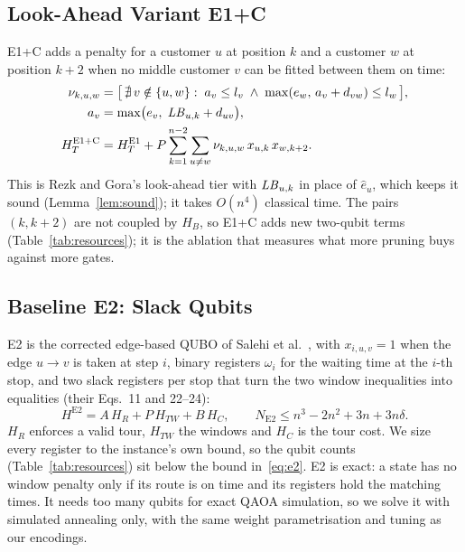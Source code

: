 \subsection{Look-Ahead Variant E1+C}\label{sec:e1c}
E1+C adds a penalty for a customer $u$ at position $k$ and a customer $w$ at position $k+2$ when
no middle customer $v$ can be fitted between them on time:
\begin{align}
  \nu_{k,u,w} &= \bigl[\,\nexists\, v \notin \{u,w\}:\; a_v \le l_v \;\land\; \max(e_w,\, a_v + d_{vw}) \le l_w\,\bigr], \label{eq:la}\\
  a_v &= \max\bigl(e_v,\; \mathit{LB}_{u,k} + d_{uv}\bigr), \nonumber\\
  H_T^{\mathrm{E1+C}} &= H_T^{\mathrm{E1}} + P\sum_{k=1}^{n-2}\sum_{u\neq w}\nu_{k,u,w}\,x_{u,k}\,x_{w,k+2}. \label{eq:HT1C}
\end{align}
This is Rezk and Gora's look-ahead tier with $\mathit{LB}_{u,k}$ in place of $\hat e_u$, which keeps it
sound (Lemma~\ref{lem:sound}); it takes $O(n^4)$ classical time. The pairs $(k,k+2)$ are not
coupled by $H_B$, so E1+C adds new two-qubit terms (Table~\ref{tab:resources}); it is the
ablation that measures what more pruning buys against more gates.

\subsection{Baseline E2: Slack Qubits}\label{sec:e2}
E2 is the corrected edge-based QUBO of Salehi et al.~\cite{salehi2022unconstrained}, with
$x_{i,u,v}=1$ when the edge $u\to v$ is taken at step $i$, binary registers $\omega_i$ for the
waiting time at the $i$-th stop, and two slack registers per stop that turn the two window
inequalities into equalities (their Eqs.~11 and 22--24):
\begin{equation}
  H^{\mathrm{E2}} = A\,H_R + P\,H_{TW} + B\,H_C, \qquad
  N_{\mathrm{E2}} \le n^3 - 2n^2 + 3n + 3n\delta. \label{eq:e2}
\end{equation}
$H_R$ enforces a valid tour, $H_{TW}$ the windows and $H_C$ is the tour cost. We size every
register to the instance's own bound, so the qubit counts (Table~\ref{tab:resources}) sit below
the bound in~\eqref{eq:e2}. E2 is exact: a state has no window penalty only if its route is on
time and its registers hold the matching times. It needs too many qubits for exact QAOA
simulation, so we solve it with simulated annealing only, with the same weight parametrisation
and tuning as our encodings.

